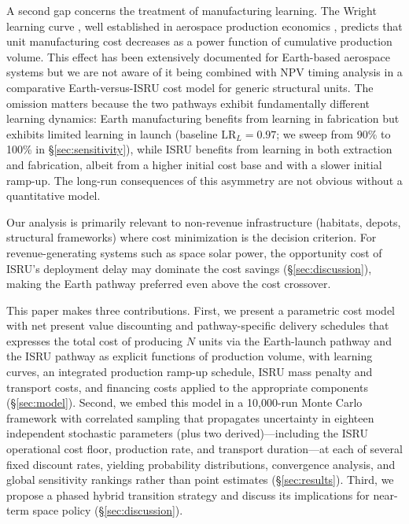 \documentclass[preprint,12pt]{elsarticle}
\begin{document}
A second gap concerns the treatment of manufacturing learning. The Wright learning curve \cite{wright1936}, well established in aerospace production economics \cite{wertz2011}, predicts that unit manufacturing cost decreases as a power function of cumulative production volume. This effect has been extensively documented for Earth-based aerospace systems \cite{argote1990,nagy2013} but we are not aware of it being combined with NPV timing analysis in a comparative Earth-versus-ISRU cost model for generic structural units. The omission matters because the two pathways exhibit fundamentally different learning dynamics: Earth manufacturing benefits from learning in fabrication but exhibits limited learning in launch (baseline $\mathrm{LR}_L = 0.97$; we sweep from 90\% to 100\% in \S\ref{sec:sensitivity}), while ISRU benefits from learning in both extraction and fabrication, albeit from a higher initial cost base and with a slower initial ramp-up. The long-run consequences of this asymmetry are not obvious without a quantitative model.

Our analysis is primarily relevant to non-revenue infrastructure (habitats, depots, structural frameworks) where cost minimization is the decision criterion. For revenue-generating systems such as space solar power, the opportunity cost of ISRU's deployment delay may dominate the cost savings (\S\ref{sec:discussion}), making the Earth pathway preferred even above the cost crossover.

This paper makes three contributions. First, we present a parametric cost model with net present value discounting and pathway-specific delivery schedules that expresses the total cost of producing $N$ units via the Earth-launch pathway and the ISRU pathway as explicit functions of production volume, with learning curves, an integrated production ramp-up schedule, ISRU mass penalty and transport costs, and financing costs applied to the appropriate components (\S\ref{sec:model}). Second, we embed this model in a 10{,}000-run Monte Carlo framework with correlated sampling that propagates uncertainty in eighteen independent stochastic parameters (plus two derived)---including the ISRU operational cost floor, production rate, and transport duration---at each of several fixed discount rates, yielding probability distributions, convergence analysis, and global sensitivity rankings rather than point estimates (\S\ref{sec:results}). Third, we propose a phased hybrid transition strategy and discuss its implications for near-term space policy (\S\ref{sec:discussion}).
\end{document}
